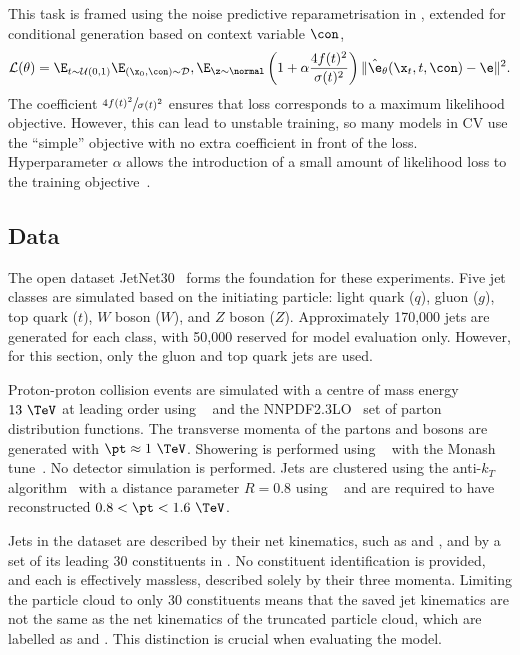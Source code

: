This task is framed using the noise predictive reparametrisation in , extended for conditional generation based on context variable $\con$,
\begin{equation}
    \label{eq:training_objective}
    \mathcal{L}(\theta) =
    \E_{t\sim \mathcal{U}(0, 1)}
    \E_{(\x_0, \con) \sim \mathcal{D}},
    \E_{\z \sim \normal}
    \left(1 + \alpha \frac{4f(t)^2}{\sigma(t)^2}\right)
    \| \hat\e_\theta (\x_t, t, \con) - \e \|^2.
\end{equation}
The coefficient $\sfrac{4f(t)^2}{\sigma(t)^2}$ ensures that loss corresponds to a maximum likelihood objective.
However, this can lead to unstable training, so many models in CV use the ``simple'' objective with no extra coefficient in front of the loss.
Hyperparameter $\alpha$ allows the introduction of a small amount of likelihood loss to the training objective~\cite{ImprovedDenoisingDiffusion}.

\subsection{Data}
\label{sec:jetgen_data}

The open dataset JetNet30~\cite{MPGAN} forms the foundation for these experiments.
Five jet classes are simulated based on the initiating particle: light quark ($q$), gluon ($g$), top quark ($t$), $W$ boson ($W$), and $Z$ boson ($Z$).
Approximately 170,000 jets are generated for each class, with 50,000 reserved for model evaluation only.
However, for this section, only the gluon and top quark jets are used.

Proton-proton collision events are simulated with a centre of mass energy $13~\TeV$ at leading order using \madgraph~\cite{MadGraph} and the \textsc{NNPDF2.3LO}~\cite{PDF2.3} set of parton distribution functions.
The transverse momenta of the partons and bosons are generated with $\pt \approx 1~\TeV$.
Showering is performed using ~\cite{Pythia8} with the Monash tune~\cite{Monash}.
No detector simulation is performed.
Jets are clustered using the anti-$k_T$ algorithm~\cite{AntiKt} with a distance parameter $R=0.8$ using \fastjet~\cite{FastJet} and are required to have reconstructed $0.8 < \pt < 1.6~\TeV$.

Jets in the dataset are described by their net kinematics, such as \mjet and \ptjet, and by a set of its leading 30 constituents in \pt.
No constituent identification is provided, and each is effectively massless, described solely by their three momenta.
Limiting the particle cloud to only 30 constituents means that the saved jet kinematics are not the same as the net kinematics of the truncated particle cloud, which are labelled as \mpc and \ptpc.
This distinction is crucial when evaluating the model.

